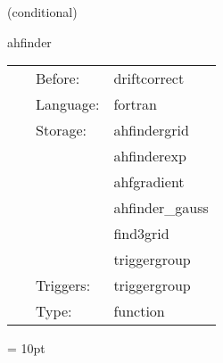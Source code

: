 \vspace{5mm}

   (conditional) 

\hspace{5mm} ahfinder 

\hspace{5mm}{\it call apparent horizon finder with persisting mask } 


\hspace{5mm}

 \begin{tabular*}{160mm}{cll} 
~ & Before:  & driftcorrect \\ 
~ & Language:  & fortran \\ 
~ & Storage:  & ahfindergrid \\ 
~& ~ &ahfinderexp\\ 
~& ~ &ahfgradient\\ 
~& ~ &ahfinder\_gauss\\ 
~& ~ &find3grid\\ 
~& ~ &triggergroup\\ 
~ & Triggers:  & triggergroup \\ 
~ & Type:  & function \\ 
\end{tabular*} 



\vspace{5mm}\parskip = 10pt 
